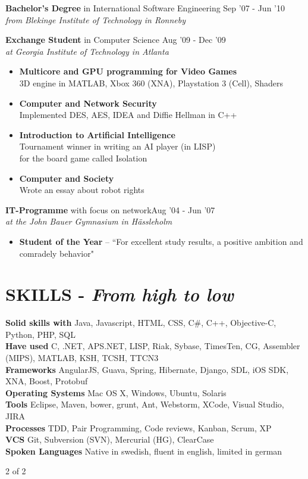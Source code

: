 \documentclass[overlapped]{res}
\begin{document}
\begin{resume}
{\bf Bachelor's Degree} in International Software Engineering \hfill Sep '07 - Jun '10\\
{\sl from Blekinge Institute of Technology in Ronneby}

{\bf Exchange Student} in Computer Science \hfill Aug '09 - Dec '09\\
{\sl at Georgia Institute of Technology in Atlanta}
\begin{itemize}
\itemsep -1pt
\item {\bf Multicore and GPU programming for Video Games}\\ 3D engine in MATLAB, Xbox 360 (XNA), Playstation 3 (Cell), Shaders 
\item {\bf Computer and Network Security}\\ Implemented DES, AES, IDEA and Diffie Hellman in C++
\item {\bf Introduction to Artificial Intelligence}\\ Tournament winner in writing an AI player (in LISP) \\for the board game called Isolation
\item {\bf Computer and Society} \\ Wrote an essay about robot rights
\end{itemize}

{\bf  IT-Programme} with focus on network\hfill Aug '04 - Jun '07\\
{\sl at the John Bauer Gymnasium in Hässleholm}
\begin{itemize}
\itemsep -1pt
\item {\bf Student of the Year}  -- ``For excellent study results, a positive ambition and \\comradely behavior"
\end{itemize}

\section {{\sc SKILLS} - {\sl From high to low}}
{\bf Solid skills with} Java, Javascript, HTML, CSS, C\#, C++, Objective-C, Python, PHP, SQL\\
{\bf Have used} C, .NET, APS.NET, LISP, Riak, Sybase, TimesTen, CG, Assembler (MIPS), MATLAB, KSH, TCSH, TTCN3 \\
{\bf Frameworks} AngularJS, Guava, Spring, Hibernate, Django, SDL, iOS SDK, XNA, Boost, Protobuf \\
{\bf Operating Systems} Mac OS X, Windows, Ubuntu, Solaris\\
{\bf Tools} Eclipse, Maven, bower, grunt, Ant, Webstorm, XCode, Visual Studio, JIRA\\
{\bf Processes} TDD, Pair Programming, Code reviews, Kanban, Scrum, XP\\
{\bf VCS} Git, Subversion (SVN), Mercurial (HG), ClearCase\\
{\bf Spoken Languages} Native in swedish, fluent in english, limited in german \\
\vspace{5.6cm}
\centerline{2 of 2}

\end{resume} 
\end{document}
